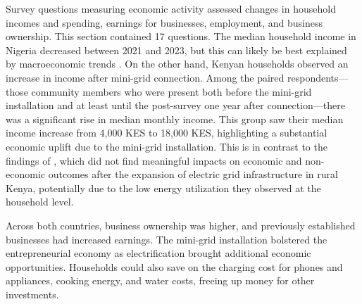 Survey questions measuring economic activity assessed changes in household incomes and spending, earnings for businesses, employment, and business ownership. This section contained 17 questions. The median household income in Nigeria decreased between 2021 and 2023, but this can likely be best explained by macroeconomic trends \cite{wb-nigeria-2,wb-nigeria-1}. On the other hand, Kenyan households observed an increase in income after mini-grid connection.
Among the paired respondents---those community members who were present both before the mini-grid installation and at least until the post-survey one year after connection---there was a significant rise in median monthly income. This group saw their median income increase from 4,000 KES to 18,000 KES, highlighting a substantial economic uplift due to the mini-grid installation. This is in contrast to the findings of \cite{lee2020experimental}, which did not find meaningful impacts on economic and non-economic outcomes after the expansion of electric grid infrastructure in rural Kenya, potentially due to the low energy utilization they observed at the household level.

Across both countries, business ownership was higher, and previously established businesses had increased earnings. The mini-grid installation bolstered the entrepreneurial economy as electrification brought additional economic opportunities. Households could also save on the charging cost for phones and appliances, cooking energy, and water costs, freeing up money for other investments.